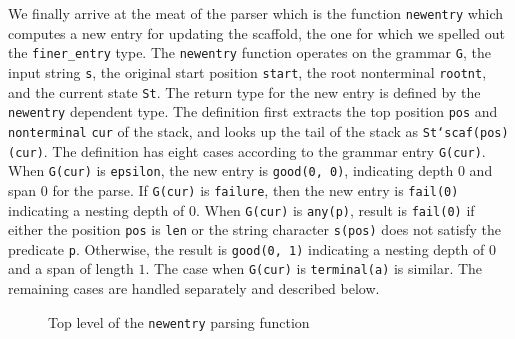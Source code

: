 \documentclass[sigplan,10pt,anonymous,review]{acmart}\settopmatter{printfolios=true,printccs=false,printacmref=false}
\begin{document}
\begin{CCSXML}

We finally arrive at the meat of the parser which is the function \texttt{newentry} which computes a new entry for updating the scaffold, the one for which we
spelled out the \texttt{finer\_entry} type.  The \texttt{newentry} function operates on the grammar \texttt{G}, the input string \texttt{s}, the original start position \texttt{start}, the root nonterminal \texttt{rootnt}, and the current
state \texttt{St}\@.  The return type for the new entry is defined
by the \texttt{newentry} dependent type.   The definition first
extracts the top position \texttt{pos} and \texttt{nonterminal} \texttt{cur}
of the stack, and looks up the tail of the stack as \texttt{St`scaf(pos)(cur)}. 
The definition has eight cases according to the grammar entry \texttt{G(cur)}\@.
When \texttt{G(cur)} is \texttt{epsilon}, the new entry is \texttt{good(0, 0)},
indicating depth $0$ and span $0$ for the parse.  If \texttt{G(cur)} is \texttt{failure}, then the new entry is \texttt{fail(0)} indicating a nesting depth of $0$\@.
When \texttt{G(cur)} is \texttt{any(p)}, result is
\texttt{fail(0)} if either the position \texttt{pos} is \texttt{len}
  or the string character \texttt{s(pos)} does not satisfy the predicate \texttt{p}\@.  Otherwise, the result is \texttt{good(0, 1)} indicating a nesting depth of $0$ and a span of length $1$\@.  
The case when \texttt{G(cur)} is \texttt{terminal(a)} is similar.
The remaining cases are handled separately and described below. 

\begin{figure}[h!]
  
    \vspace*{-4mm}
\caption{\small Top level of the \texttt{newentry} parsing function}
\label{pvs:newentrytop}
\end{figure}



\end{CCSXML}
\end{document}
